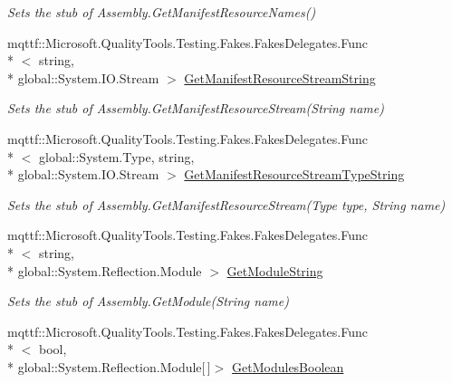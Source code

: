 \begin{DoxyCompactItemize}
\begin{DoxyCompactList}\small\item\em Sets the stub of Assembly.\-Get\-Manifest\-Resource\-Names()\end{DoxyCompactList}\item 
mqttf\-::\-Microsoft.\-Quality\-Tools.\-Testing.\-Fakes.\-Fakes\-Delegates.\-Func\\*
$<$ string, \\*
global\-::\-System.\-I\-O.\-Stream $>$ \hyperlink{class_system_1_1_reflection_1_1_fakes_1_1_stub_assembly_a27bf52115cb07995f03357f20a29cee5}{Get\-Manifest\-Resource\-Stream\-String}
\begin{DoxyCompactList}\small\item\em Sets the stub of Assembly.\-Get\-Manifest\-Resource\-Stream(\-String name)\end{DoxyCompactList}\item 
mqttf\-::\-Microsoft.\-Quality\-Tools.\-Testing.\-Fakes.\-Fakes\-Delegates.\-Func\\*
$<$ global\-::\-System.\-Type, string, \\*
global\-::\-System.\-I\-O.\-Stream $>$ \hyperlink{class_system_1_1_reflection_1_1_fakes_1_1_stub_assembly_a9002db3163c6b0bcfa1e6e4b57f8f80c}{Get\-Manifest\-Resource\-Stream\-Type\-String}
\begin{DoxyCompactList}\small\item\em Sets the stub of Assembly.\-Get\-Manifest\-Resource\-Stream(\-Type type, String name)\end{DoxyCompactList}\item 
mqttf\-::\-Microsoft.\-Quality\-Tools.\-Testing.\-Fakes.\-Fakes\-Delegates.\-Func\\*
$<$ string, \\*
global\-::\-System.\-Reflection.\-Module $>$ \hyperlink{class_system_1_1_reflection_1_1_fakes_1_1_stub_assembly_a7c04d2f2a63fef0e36f07742b33fb11f}{Get\-Module\-String}
\begin{DoxyCompactList}\small\item\em Sets the stub of Assembly.\-Get\-Module(\-String name)\end{DoxyCompactList}\item 
mqttf\-::\-Microsoft.\-Quality\-Tools.\-Testing.\-Fakes.\-Fakes\-Delegates.\-Func\\*
$<$ bool, \\*
global\-::\-System.\-Reflection.\-Module\mbox{[}$\,$\mbox{]}$>$ \hyperlink{class_system_1_1_reflection_1_1_fakes_1_1_stub_assembly_ab76f77a37bfe5a7339a8db37e18f7764}{Get\-Modules\-Boolean}

\end{DoxyCompactItemize}
